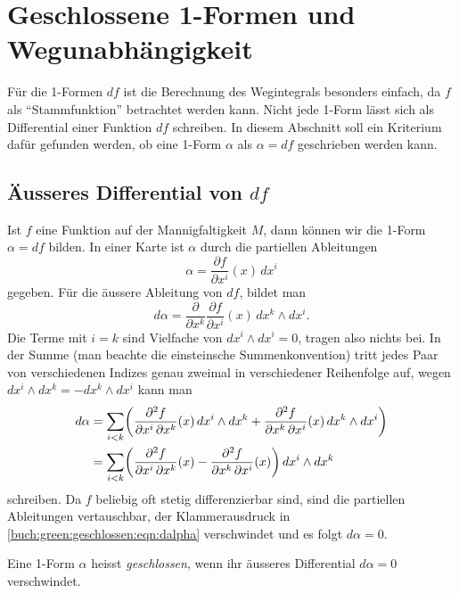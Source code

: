 %
%
\section{Geschlossene 1-Formen und Wegunabhängigkeit
\label{buch:green:section:geschlossen}}
Für die 1-Formen $df$ ist die Berechnung des Wegintegrals besonders
einfach, da $f$ als ``Stammfunktion'' betrachtet werden kann.
Nicht jede 1-Form lässt sich als Differential einer Funktion $df$ 
schreiben.
In diesem Abschnitt soll ein Kriterium dafür gefunden werden, 
ob eine 1-Form $\alpha$ als $\alpha=df$ geschrieben werden kann.

%
%
\subsection{Äusseres Differential von $df$}
Ist $f$ eine Funktion auf der Mannigfaltigkeit $M$, dann können wir
die 1-Form $\alpha = df$ bilden.
In einer Karte ist $\alpha$ durch die partiellen Ableitungen
\[
\alpha
=
\frac{\partial f}{\partial x^i}(x)\,dx^i
\]
gegeben.
Für die äussere Ableitung von $df$, bildet man
\[
d\alpha
=
\frac{\partial}{\partial x^k}
\frac{\partial f}{\partial x^i}(x)\,
dx^k
\wedge
dx^i.
\]
Die Terme mit $i=k$ sind Vielfache von $dx^i\wedge dx^i=0$, tragen
also nichts bei.
In der Summe (man beachte die einsteinsche Summenkonvention)
tritt jedes Paar von verschiedenen Indizes genau zweimal in verschiedener
Reihenfolge auf, wegen $dx^i\wedge dx^k = - dx^k \wedge dx^i$ kann man
\begin{align}
d\alpha
&=
\sum_{i < k}
\biggl(
\frac{\partial^2 f}{\partial x^i\,\partial x^k}(x)\, dx^i\wedge dx^k
+
\frac{\partial^2 f}{\partial x^k\,\partial x^i}(x)\, dx^k\wedge dx^i
\biggr)
\notag
\\
&=
\sum_{i < k}
\biggl(
\frac{\partial^2 f}{\partial x^i\,\partial x^k}(x)
-
\frac{\partial^2 f}{\partial x^k\,\partial x^i}(x)
\biggr)
\, dx^i\wedge dx^k
\label{buch:green:geschlossen:eqn:dalpha}
\end{align}
schreiben.
Da $f$ beliebig oft stetig differenzierbar sind, sind die partiellen
Ableitungen vertauschbar, der Klammerausdruck in
\eqref{buch:green:geschlossen:eqn:dalpha}
verschwindet und es folgt $d\alpha = 0$.

\begin{definition}
%
Eine 1-Form $\alpha$ heisst {\em geschlossen}, wenn ihr äusseres
Differential $d\alpha=0$ verschwindet.
\end{definition}

